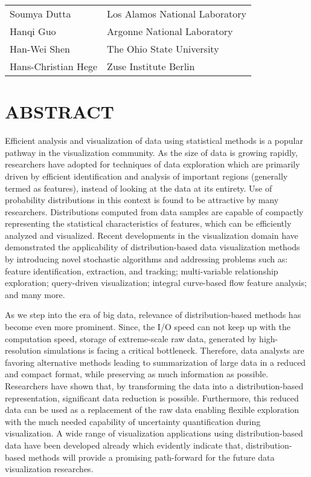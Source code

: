 \documentclass[preprint,journal]{vgtc}       %
\begin{document}
\vspace{-0.1in}
\begin{table}[H]
\begin{tabular}{ll}
Soumya Dutta & Los Alamos National Laboratory\\
Hanqi Guo & Argonne National Laboratory\\
Han-Wei Shen & The Ohio State University\\
Hans-Christian Hege & Zuse Institute Berlin\\
\end{tabular}
\end{table}

\section*{ABSTRACT}
Efficient analysis and visualization of data using statistical methods is a popular pathway in the visualization community. As the size of data is growing rapidly, researchers have adopted for techniques of data exploration which are primarily driven by efficient identification and analysis of important regions (generally termed as features), instead of looking at the data at its entirety. Use of probability distributions in this context is found to be attractive by many researchers. Distributions computed from data samples are capable of compactly representing the statistical characteristics of features, which can be efficiently analyzed and visualized. Recent developments in the visualization domain have demonstrated the applicability of distribution-based data visualization methods by introducing novel stochastic algorithms and addressing problems such as: feature identification, extraction, and tracking; multi-variable relationship exploration; query-driven visualization; integral curve-based flow feature analysis; and many more.

As we step into the era of big data, relevance of distribution-based methods has become even more prominent. Since, the I/O speed can not keep up with the computation speed, storage of extreme-scale raw data, generated by high-resolution simulations is facing a critical bottleneck. Therefore, data analysts are favoring alternative methods leading to summarization of large data in a reduced and compact format, while preserving as much information as possible. Researchers have shown that, by transforming the data into a distribution-based representation, significant data reduction is possible. Furthermore, this reduced data can be used as a replacement of the raw data enabling flexible exploration with the much needed capability of uncertainty quantification during visualization. A wide range of visualization applications using distribution-based data have been developed already which evidently indicate that, distribution-based methods will provide a promising path-forward for the future data visualization researches.
\end{document}
